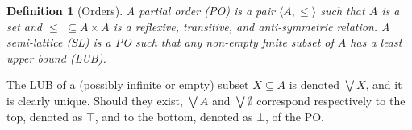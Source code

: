 \documentclass[preprint,12pt]{elsarticle}
\newtheorem{definition}{Definition}
\newcommand{\comment}[1]{}
\def\monid{{\mathbf 0}}
\def\monid{\mathbf{1}}
\begin{document}
\begin{definition}[Orders]
	A partial order (PO) is a pair $\langle A, \leq \rangle$ such that
	$A$ is a set %
	and $\leq \,\,\subseteq A \times A$ is a reflexive, transitive, and
	anti-symmetric  relation.
	A semi-lattice (SL) is a PO
	such that any non-empty finite subset of $A$ has a least upper bound (LUB).
\end{definition}

The LUB of a (possibly infinite or empty) subset $X \subseteq A$ is denoted $\bigvee X$, and it is clearly unique.
Should  they exist, $\bigvee A$ and $\bigvee \emptyset$ correspond respectively to the top, denoted as 
$\top$, and to the bottom, denoted as $\bot$, of the PO.

\comment{\begin{definition}[Compact elements]
		An element $a \in A$ is compact 
		if whenever $a \leq \bigvee Y$ for some $Y \subseteq A$
		there exists a finite subset
		$X \subseteq Y$ such that $a \leq \bigvee X$.
	\end{definition}
	
	We let $A^C \subseteq A$ denote the set of compact elements of ${\mathbb C}$. }

%



%
%
\end{document}
